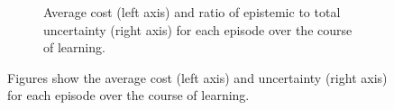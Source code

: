 \begin{figure}[htp!]
\begin{subfigure}[b]{1\linewidth}
    \caption{Average cost (left axis) and ratio of epistemic to total uncertainty (right axis) for each episode over the course of learning.} 
    \label{Fig:Re-pen-uncertainty-norm} 
  \end{subfigure} 
\caption[Uncertainty decomposition for \textbf{pendubot} environment]{Figures show the average cost (left axis) and uncertainty (right axis) for each episode over the course of learning.}
\label{Fig:Re-pen-full-uncertainty} 
\end{figure}

%
%
%
%
%
%






